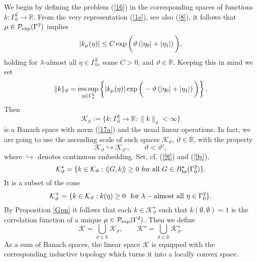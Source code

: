 \documentclass[reqno,11pt]{amsart}
\theoremstyle{definition}
\theoremstyle{remark}
\numberwithin{equation}{section}
\begin{document}
We begin by defining the problem (\ref{16}) in the corresponding
spaces of functions $k:\Gamma_0^2 \to \mathds{R}$. From the very
representation (\ref{1e}), see also (\ref{8}), it follows that $\mu
\in \mathcal{P}_{\rm exp}(\Gamma^2)$ implies
\begin{equation*}
  
 |k_\mu (\eta)| \leq C \exp\bigg{(} \vartheta  \left( |\eta_0| +
|\eta_1|\right)\bigg{)},
\end{equation*}
holding for $\lambda$-almost all $\eta\in \Gamma_0^2$, some $C>0$,
and $\vartheta\in \mathds{R}$. Keeping this in mind we set
\begin{equation}
  \label{17a}
 \|k\|_\vartheta = \operatorname*{\mathrm{ess\,sup}}_{\eta \in \Gamma^2_0}\left\{ |k_\mu (\eta)| \exp\bigg{(} - \vartheta\left(
  |\eta_0| +|\eta_1| \right)\bigg{)} \right\}.
\end{equation}
Then
\begin{equation*}
 
\mathcal{K}_\vartheta := \{ k:\Gamma^2_0\to \mathds{R}:
\|k\|_\vartheta <\infty\}
\end{equation*}
is a Banach space with norm (\ref{17a}) and the usual linear
operations. In fact, we are going to use the ascending scale of such
spaces $\mathcal{K}_\vartheta$, $\vartheta \in \mathds{R}$, with the
property
\begin{equation}
  \label{19}
\mathcal{K}_\vartheta \hookrightarrow \mathcal{K}_{\vartheta'},
\qquad \vartheta < \vartheta',
\end{equation}
where $\hookrightarrow$  denotes continuous embedding. Set, cf.
(\ref{9f}) and (\ref{9g}),
\begin{equation}
  \label{19a}
\mathcal{K}^\star_\vartheta =\{k\in \mathcal{K}_\vartheta: \langle
\! \langle G,k \rangle \! \rangle \geq 0 \ {\rm for} \ {\rm all} \
G\in B^\star_{\rm bs} (\Gamma_0^2)\}.
\end{equation}
It is a subset of the cone
\begin{equation}
  \label{19b}
\mathcal{K}^+_\vartheta =\{k\in \mathcal{K}_\vartheta: k(\eta) \geq
0 \ \ {\rm for} \  \lambda-{\rm almost} \ {\rm all} \ \eta \in
\Gamma_0^2\}.
\end{equation}
By Proposition \ref{Gpn} it follows that each $k\in
\mathcal{K}^\star_\vartheta$ such that $k(\emptyset,\emptyset) = 1$
is the correlation function of a unique $\mu\in \mathcal{P}_{\rm
exp}(\Gamma^2)$. Then we define
\begin{equation}
  \label{19c}
\mathcal{K} = \bigcup_{\vartheta \in \mathds{R}}
\mathcal{K}_\vartheta, \qquad \mathcal{K}^\star = \bigcup_{\vartheta
\in \mathds{R}} \mathcal{K}_\vartheta^\star.
\end{equation}
As a sum of Banach spaces, the linear space $\mathcal{K}$ is
equipped with the corresponding inductive topology which turns it
into a locally convex space.
\end{document}
